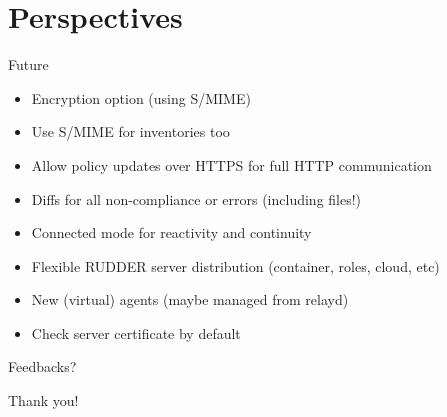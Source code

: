 \documentclass[aspectratio=169, 14pt]{beamer}
\begin{document}
\section{Perspectives}

\begin{frame}{Future}
	\begin{itemize}
		\item Encryption option (using S/MIME)
		\item Use S/MIME for inventories too
		\item Allow policy updates over HTTPS for full HTTP communication
		\item Diffs for all non-compliance or errors (including files!)
		\item Connected mode for reactivity and continuity
		\item Flexible RUDDER server distribution (container, roles, cloud, etc)
		\item New (virtual) agents (maybe managed from relayd)
		\item Check server certificate by default
	\end{itemize}
\end{frame}

\begin{frame}[standout]
	Feedbacks?
\end{frame}

\begin{frame}[standout]
	Thank you!
\end{frame}
\end{document}
